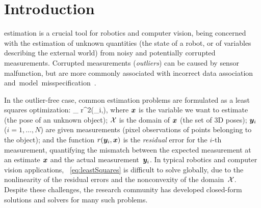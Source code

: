 
\section{Introduction}
\label{sec:introduction}
estimation is a crucial tool for robotics and computer vision, 
being
concerned with the estimation of unknown quantities 
(\eg the state of a robot, or of variables describing the external world) 
from noisy and potentially corrupted measurements. Corrupted measurements (\ie \emph{outliers}) can be caused by sensor malfunction, but are  more commonly associated with %
incorrect data association \mbox{and model misspecification~\cite{Cadena16tro-SLAMsurvey,Yang19rss-teaser}.} 

In the outlier-free case, common estimation problems 
are formulated as a least squares optimization: %
\bea \label{eq:leastSquares}
\min_{\vxx \in \calX} \;\sumAllPointsi r^2(\vy_i,\vxx),
\eea 
where ${\bm x}$ is the variable we want to estimate (\eg the pose of an unknown object); 
${\cal X}$ is the domain of ${\bm x}$ (\eg the set of 3D poses);
${\bm y}_i$ ($i=1,\ldots,N$) are given measurements (\eg pixel observations of points belonging to the object); 
  and the function $r({\bm y}_i,{\bm x})$ is the \emph{residual} error for the $i$-th measurement,
quantifying the mismatch between the expected measurement at an estimate ${\bm x}$ and the actual measurement~${\bm y}_i$.
In typical robotics and computer vision applications, 
~\eqref{eq:leastSquares} is difficult to solve globally, due to the nonlinearity of the 
residual errors and the nonconvexity of the domain~${\cal X}$. Despite these challenges, 
the research community has developed closed-form solutions and solvers for many such problems.
